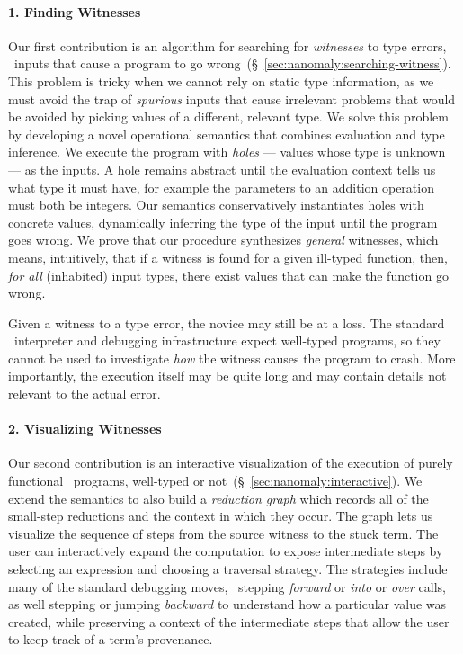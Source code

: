 \paragraph{1. Finding Witnesses}
Our first contribution is an algorithm for searching for
\emph{witnesses} to type errors, \ie\ inputs that cause a
program to go wrong~(\S~\ref{sec:nanomaly:searching-witness}).
%
This problem is tricky when we cannot rely on
static type information, as we must avoid the
trap of \emph{spurious} inputs that cause
irrelevant problems that would be avoided
by picking values of a different, relevant type.
%
We solve this problem by developing a novel
operational semantics that combines evaluation
and type inference.
%
We execute the program with \emph{holes} --- values whose type is
unknown --- as the inputs.
%
A hole remains abstract until the evaluation
context tells us what type it must have, for
example the parameters to an addition operation
must both be integers.
%
Our semantics conservatively instantiates holes
with concrete values, dynamically inferring the
type of the input until the program goes wrong.
%
We prove that our procedure synthesizes \emph{general}
witnesses, which means, intuitively, that if a witness
is found for a given ill-typed function, then, \emph{for all}
(inhabited) input types, there exist values that can make
the function go wrong.

Given a witness to a type error, the novice may still be at a loss.
%
The standard \ocaml\ interpreter and debugging infrastructure expect
well-typed programs, so they cannot be used to investigate \emph{how}
the witness causes the program to crash.
%
More importantly, the execution itself may be quite long and may contain
details not relevant to the actual error.

\paragraph{2. Visualizing Witnesses}
Our second contribution is an interactive visualization of the
execution of purely functional \ocaml\ programs, well-typed or not~(\S~\ref{sec:nanomaly:interactive}).
%
We extend the semantics to also build a \emph{reduction graph}
which records all of the small-step reductions and the context
in which they occur.
%
The graph lets us visualize the sequence of
steps from the source witness to the stuck term. The user can
interactively expand the computation to expose intermediate steps
by selecting an expression and choosing a traversal strategy.
%
The strategies include many of the standard debugging moves, \eg\
stepping \emph{forward} or \emph{into} or \emph{over} calls, as well
stepping or jumping \emph{backward} to understand how a particular
value was created, while preserving a context of the intermediate
steps that allow the user to keep track of a term's provenance.

